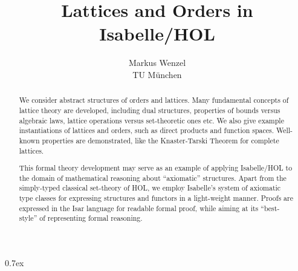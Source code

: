 \documentclass[11pt,a4paper]{article}
\begin{document}
\title{Lattices and Orders in Isabelle/HOL}
\author{Markus Wenzel \\ TU M\"unchen}
\maketitle

\begin{abstract}
  We consider abstract structures of orders and lattices.  Many fundamental
  concepts of lattice theory are developed, including dual structures,
  properties of bounds versus algebraic laws, lattice operations versus
  set-theoretic ones etc.  We also give example instantiations of lattices and
  orders, such as direct products and function spaces.  Well-known properties
  are demonstrated, like the Knaster-Tarski Theorem for complete lattices.
  
  This formal theory development may serve as an example of applying
  Isabelle/HOL to the domain of mathematical reasoning about ``axiomatic''
  structures.  Apart from the simply-typed classical set-theory of HOL, we
  employ Isabelle's system of axiomatic type classes for expressing structures
  and functors in a light-weight manner.  Proofs are expressed in the Isar
  language for readable formal proof, while aiming at its ``best-style'' of
  representing formal reasoning.
\end{abstract}

\tableofcontents

\newpage
{
  \parindent 0pt\parskip 0.7ex
  \pagestyle{myheadings}
  \renewcommand{\setisabellecontext}[1]{\markright{THEORY~``#1''}}
  
}

\nocite{Wenzel:1999:TPHOL}
\nocite{Wenzel:2000:isar-ref}
\nocite{Wenzel:2000:axclass}
\nocite{Bauer-Wenzel:2000:HB}



\end{document}
